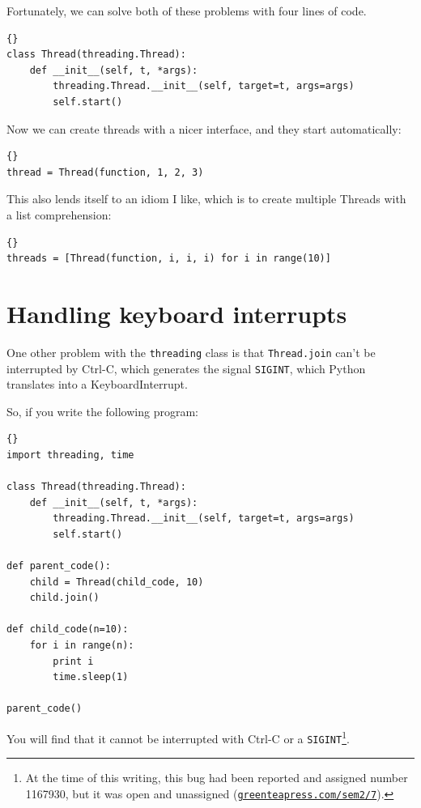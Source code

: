 \documentclass{book}
\newcommand{\shortlink}[1]{\href{https://greenteapress.com/sem2/#1}{\nolinkurl{greenteapress.com/sem2/#1}}}
\begin{document}
Fortunately, we can solve both of these problems with four
lines of code.

\begin{lstlisting}[title={Cleaned-up Thread class}]{}
class Thread(threading.Thread):
    def __init__(self, t, *args):
        threading.Thread.__init__(self, target=t, args=args)
        self.start()
\end{lstlisting}

Now we can create threads with a nicer interface, and they
start automatically:

\begin{lstlisting}[title={Thread example (my way)}]{}
thread = Thread(function, 1, 2, 3)
\end{lstlisting}

This also lends itself to an idiom I like, which is to create
multiple Threads with a list comprehension:

\begin{lstlisting}[title={Multiple thread example}]{}
threads = [Thread(function, i, i, i) for i in range(10)]
\end{lstlisting}

\section{Handling keyboard interrupts}

One other problem with the {\tt threading} class is that 
{\tt Thread.join} can't be interrupted by Ctrl-C, which
generates the signal {\tt SIGINT}, which Python translates
into a KeyboardInterrupt.

\newpage
So, if you write the following program:

\begin{lstlisting}[title={Unstoppable program}]{}
import threading, time

class Thread(threading.Thread):
    def __init__(self, t, *args):
        threading.Thread.__init__(self, target=t, args=args)
        self.start()

def parent_code():
    child = Thread(child_code, 10)
    child.join()

def child_code(n=10):
    for i in range(n):
        print i
        time.sleep(1)
    
parent_code()
\end{lstlisting}

You will find that it cannot be interrupted with Ctrl-C or
a {\tt SIGINT}\footnote{At the time of this writing, this
bug had been reported and assigned number 1167930, but it was
open and unassigned (\shortlink{7}).}.
\end{document}
